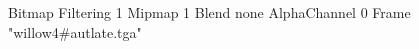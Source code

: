 {Bitmap
	{Filtering 1}
	{Mipmap 1}
	{Blend none}
	{AlphaChannel 0}
	{Frame "willow4#autlate.tga"}
}

